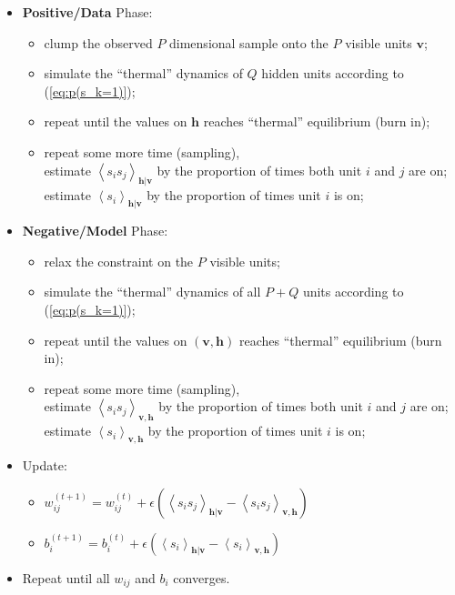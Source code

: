 \documentclass[11pt]{article}
\newcommand{\mean}[2]{\left\langle{#1}\right\rangle_{#2}}
\newcommand{\vh}{\boldsymbol{h}}
\newcommand{\vv}{\boldsymbol{v}}
\begin{document}
{\begin{itemize}
\item \textbf{Positive/Data} Phase:
  \begin{itemize}
  \item clump the observed $P$ dimensional sample onto the $P$ visible units $\vv$;
  \item simulate the ``thermal'' dynamics of $Q$ hidden units according to (\ref{eq:p(s_k=1)});
  \item repeat until the values on $\vh$ reaches ``thermal'' equilibrium (burn in);
  \item repeat some more time (sampling), \\
    estimate $\mean{s_i s_j}{\vh|\vv}$ by the proportion of times both unit $i$ and $j$ are on; \\
    estimate $\mean{s_i}{\vh|\vv}$ by the proportion of times unit $i$ is on;
  \end{itemize}
\item \textbf{Negative/Model} Phase:
  \begin{itemize}
  \item relax the constraint on the $P$ visible units;
  \item simulate the ``thermal'' dynamics of all $P + Q$ units according to (\ref{eq:p(s_k=1)});
  \item repeat until the values on $(\vv, \vh)$ reaches ``thermal'' equilibrium (burn in);
  \item repeat some more time (sampling), \\
    estimate $\mean{s_i s_j}{\vv, \vh}$ by the proportion of times both unit $i$ and $j$ are on; \\
    estimate $\mean{s_i}{\vv, \vh}$ by the proportion of times unit $i$ is on;
  \end{itemize}
\item Update:
  \begin{itemize}
  \item \quad $w_{ij}^{(t+1)} = w_{ij}^{(t)} + \epsilon (\mean{s_i s_j}{\vh|\vv} - \mean{s_i s_j}{\vv, \vh})$
  \item \quad $b_i^{(t+1)}    = b_i^{(t)}    + \epsilon (\mean{s_i    }{\vh|\vv} - \mean{s_i    }{\vv, \vh})$
  \end{itemize}
\item Repeat until all $w_{ij}$ and $b_i$ converges.
\end{itemize}
}
\end{document}
